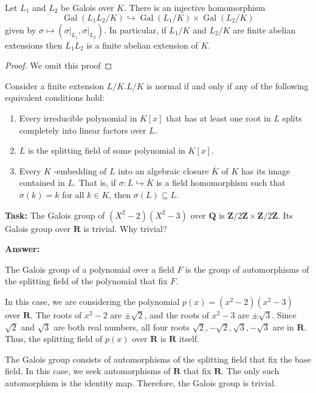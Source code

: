 \begin{theorem}
Let $L_1$ and $L_2$ be Galois over $K$. There is an injective homomorphism
\[
\operatorname{Gal}\left(L_1 L_2 / K\right) \hookrightarrow \operatorname{Gal}\left(L_1 / K\right) \times \operatorname{Gal}\left(L_2 / K\right)
\]given by $\sigma \mapsto\left(\left.\sigma\right|_{L_1},\left.\sigma\right|_{L_2}\right)$. In particular, if $L_1 / K$ and $L_2 / K$ are finite abelian extensions then $L_1 L_2$ is a finite abelian extension of $K$.
\end{theorem}
\begin{proof}
We omit this proof
\end{proof}

\begin{proposition}
Consider a finite extension $L / K . L / K$ is normal if and only if any of the following equivalent conditions hold:
	\begin{enumerate}
		\item Every irreducible polynomial in $K[x]$ that has at least one root in $L$ splits completely into linear factors over $L$.
		\item $L$ is the splitting field of some polynomial in $K[x]$.
		\item Every $K$ -embedding of $L$ into an algebraic closure $\bar{K}$ of $K$ has its image contained in $L$. That is, if $\sigma: L \hookrightarrow \bar{K}$ is a field homomorphism such that $\sigma(k)=k$ for all $k \in K$, then $\sigma(L) \subseteq L$.
	\end{enumerate}
\end{proposition}
\textbf{Task:} The Galois group of $\left(X^2-2\right)\left(X^2-3\right)$ over $\mathbf{Q}$ is $\mathbf{Z} / 2 \mathbf{Z} \times \mathbf{Z} / 2 \mathbf{Z}$. Its Galois group over $\mathbf{R}$ is trivial. Why trivial?

\textbf{Answer:}

The Galois group of a polynomial over a field $F$ is the group of automorphisms of the splitting field of the polynomial that fix $F$.

In this case, we are considering the polynomial $p(x) = (x^2 - 2)(x^2 - 3)$ over $\mathbf{R}$.
The roots of $x^2 - 2$ are $\pm\sqrt{2}$, and the roots of $x^2 - 3$ are $\pm\sqrt{3}$.  Since $\sqrt{2}$ and $\sqrt{3}$ are both real numbers, all four roots $\sqrt{2}, -\sqrt{2}, \sqrt{3}, -\sqrt{3}$ are in $\mathbf{R}$. Thus, the splitting field of $p(x)$ over $\mathbf{R}$ is $\mathbf{R}$ itself.

The Galois group consists of automorphisms of the splitting field that fix the base field. In this case, we seek automorphisms of $\mathbf{R}$ that fix $\mathbf{R}$. The only such automorphism is the identity map. Therefore, the Galois group is trivial.

